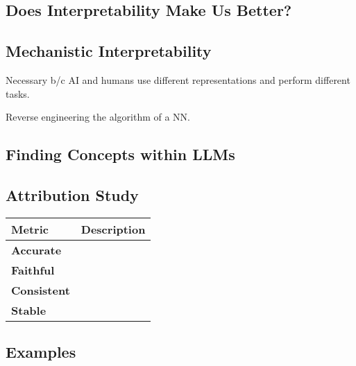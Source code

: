 \subsection{Does Interpretability Make Us Better?}

\subsection{Mechanistic Interpretability}
\begin{motivation}
    Necessary b/c AI and humans use different representations and perform different tasks. 
\end{motivation}
\begin{definition}
    Reverse engineering the algorithm of a NN. 
\end{definition}

\subsection{Finding Concepts within LLMs}

\subsection{Attribution Study}
\begin{summary}
    \begin{center}
        \begin{tabular}{ll}
            \toprule
            \textbf{Metric} & \textbf{Description} \\
            \midrule
            \textbf{Accurate} & \\
            \midrule
            \textbf{Faithful} & \\
            \midrule
            \textbf{Consistent} & \\
            \midrule
            \textbf{Stable} & \\
        \end{tabular}
    \end{center}    
\end{summary}

\begin{summary}
    
\end{summary}

\subsection{Examples}